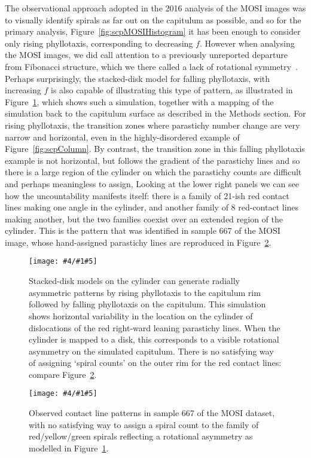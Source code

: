 \documentclass[a4paper,10pt]{amsart}
\newlength{\jfigwidth}
\newcommand{\jpgfig}[3]{\jdofig{#1}{#2}{#3}{Figures}{.jpg}}
\newcommand{\pdffig}[3]{\jdofig{#1}{#2}{#3}{Figures}{.pdf}}
\newcommand{\jdofig}[5]{
	\begin{figure}\centering\texttt{[image: \#4/\#1\#5]} \caption{#2}\label{fig:#1}\end{figure}
}
\begin{document}
The observational approach adopted in the 2016 analysis of the MOSI images was to visually identify spirals as far out on the capitulum as possible, and so for the primary analysis, Figure~\ref{fig:scpMOSIHistogram} it has been enough to consider only rising phyllotaxis, corresponding to decreasing $f$. 
However when analysing the MOSI images, we did call attention to a previously unreported departure from Fibonacci structure, which we there called a lack of rotational symmetry~\cite{swintonNovelFibonacciNonFibonacci2016}. Perhaps surprisingly, the stacked-disk model for falling phyllotaxis, with increasing $f$ is also capable of illustrating this type of pattern, as illustrated in Figure~\ref{fig:scpFalling}, which 
shows such a simulation, together with a mapping of the simulation back to the capitulum surface as described in the Methods section. 
For rising phyllotaxis, the transition zones where parastichy number change are very narrow and horizontal, even in the highly-disordered example of Figure~\ref{fig:scpColumn}. By contrast, the transition zone in this falling phyllotaxis example is not horizontal, but follows the gradient of the parastichy lines and so  there is a large region of the cylinder on which the parastichy counts are difficult and perhaps meaningless to assign, Looking at the lower right panels we can see how the uncountability manifests itself: there is a family of 21-ish red contact lines making one angle in the cylinder, and another family of 8 red-contact lines making another, but the two families coexist over an extended region of the cylinder. This is the pattern that was identified in sample 667 of the MOSI image, whose hand-assigned parastichy lines are reproduced in Figure~\ref{fig:667nophoto}.
 
\pdffig{scpFalling}{Stacked-disk models on the cylinder can generate radially asymmetric patterns by rising phyllotaxis to the capitulum rim followed by falling phyllotaxis on the capitulum. This simulation shows horizontal variability in the location on the cylinder of dislocations of the red right-ward leaning parastichy lines. When the cylinder is mapped to a disk, this corresponds to a visible rotational asymmetry on the simulated capitulum.    There is no satisfying way of assigning `spiral counts' on the outer rim for the red contact lines: compare Figure~\ref{fig:667nophoto}.}{1}

\jpgfig{667nophoto}{Observed contact line patterns in sample 667 of the MOSI dataset, with no satisfying way to assign a spiral count to the family of red/yellow/green spirals reflecting a rotational asymmetry as modelled in Figure~\ref{fig:scpFalling}.}{.5}
\end{document}
